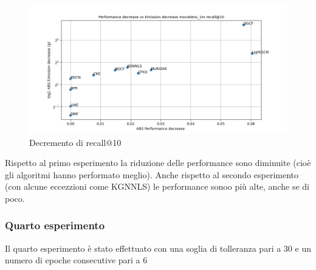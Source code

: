 \begin{figure}[H]
    \centering
     \includegraphics[width=\textwidth]{images/decrement_recall@10_movielens_1m_40_6.png}
    \caption{Decremento di recall@10}
\end{figure}

\noindent Rispetto al primo esperimento la riduzione delle performance sono diminuite (cioè gli algoritmi hanno performato meglio). Anche rispetto al secondo esperimento (con alcune eccezzioni come KGNNLS) le performance sonoo più alte, anche se di poco.




\subsubsection{Quarto esperimento}
Il quarto esperimento è stato effettuato con una soglia di tolleranza pari a 30 e un numero di epoche consecutive pari a 6



